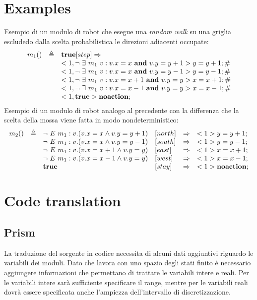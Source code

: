 \section{Examples}
Esempio di un modulo di robot che esegue una \emph{random walk} su una griglia escludedo dalla scelta probabilistica le direzioni adiacenti occupate:
$$
\begin{array}{rcl}
m_1 () & \triangleq & \mathbf{true} [step]\Rightarrow \\ 
	& & <1, \neg \mbox{ } \exists \mbox{ } m_1 \mbox{ } v: v.x=x \mbox{ } \mathbf{and} \mbox{ } v.y=y+1> y=y+1; \# \\
	& & <1, \neg \mbox{ } \exists \mbox{ } m_1 \mbox{ } v: v.x=x \mbox{ } \mathbf{and} \mbox{ } v.y=y-1> y=y-1; \# \\ 
	& & <1, \neg \mbox{ } \exists \mbox{ } m_1 \mbox{ } v: v.x=x+1 \mbox{ } \mathbf{and} \mbox{ } v.y=y> x=x+1; \# \\ 
	& & <1, \neg \mbox{ } \exists \mbox{ } m_1 \mbox{ } v: v.x=x-1 \mbox{ } \mathbf{and} \mbox{ } v.y=y> x=x-1; \# \\ 
	& & <1, \mathbf{true}> \mathbf{noaction};\\ 
\end{array}
$$
Esempio di un modulo di robot analogo al precedente con la differenza che la scelta della mossa viene fatta in modo nondeterministico:
$$
\begin{array}{rcllcl}
m_2 () & \triangleq & \neg \mbox{ } E \mbox{ } m_1 : v . (v.x=x \wedge v.y=y+1) &[north]&\Rightarrow& <1> y=y+1; \\ 
	& & \neg \mbox{ } E \mbox{ } m_1 : v . (v.x=x \wedge v.y=y-1) &[south]&\Rightarrow& <1> y=y-1; \\ 
	& & \neg \mbox{ } E \mbox{ } m_1 : v . (v.x=x+1 \wedge v.y=y) &[east]&\Rightarrow& <1> x=x+1; \\ 
	& & \neg \mbox{ } E \mbox{ } m_1 : v . (v.x=x-1 \wedge v.y=y) &[west]&\Rightarrow& <1> x=x-1; \\ 
	& & \mathbf{true} &[stay]&\Rightarrow& <1> \mathbf{noaction}; \\ 
\end{array}
$$

\section{Code translation}
\subsection{Prism}
La traduzione del sorgente \seal{} in codice \prism{} necessita di alcuni dati aggiuntivi riguardo le variabili dei moduli. Dato che \prism{} lavora con uno spazio degli stati finito è necessario aggiungere informazioni che permettano di trattare le variabili intere e reali. Per le variabili intere sarà sufficiente specificare il range, mentre per le variabili reali dovrà essere specificata anche l'ampiezza dell'intervallo di discretizzazione.


